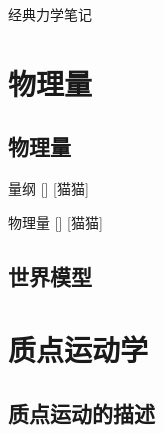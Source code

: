 \documentclass[UTF8]{ctexart}
\begin{document}
\begin{center}
    {\LARGE 经典力学笔记}
\end{center}

\section{物理量}

    \subsection{物理量}

        \begin{dfn}
            []
            {量纲}
            []
            [猫猫]
        \end{dfn}

        \begin{str}
            []
            {物理量}
            []
            [猫猫]
        \end{str}

    \subsection{世界模型}

\section{质点运动学}

    \subsection{质点运动的描述}
        
\end{document}
